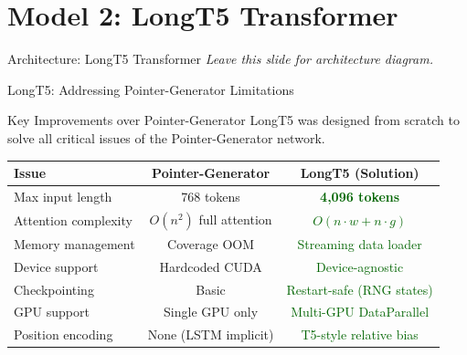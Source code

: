 \documentclass[10pt, aspectratio=169]{beamer}
\begin{document}
\section{Model 2: LongT5 Transformer}

\begin{frame}{Architecture: LongT5 Transformer}
  \vspace{-0.2cm}
  {\small \textit{Leave this slide for architecture diagram.}}
\end{frame}

\begin{frame}{LongT5: Addressing Pointer-Generator Limitations}
  \begin{block}{Key Improvements over Pointer-Generator}
    LongT5 was designed from scratch to solve all critical issues of the Pointer-Generator network.
  \end{block}

  \vspace{0.2cm}

  \begin{table}
    \centering
    \small
    \begin{tabular}{lcc}
      \toprule
      \textbf{Issue} & \textbf{Pointer-Generator} & \textbf{LongT5 (Solution)} \\
      \midrule
      Max input length & 768 tokens & \textcolor{darkgreen}{\textbf{4,096 tokens}} \\
      Attention complexity & $O(n^2)$ full attention & \textcolor{darkgreen}{$O(n \cdot w + n \cdot g)$} \\
      Memory management & Coverage OOM & \textcolor{darkgreen}{Streaming data loader} \\
      Device support & Hardcoded CUDA & \textcolor{darkgreen}{Device-agnostic} \\
      Checkpointing & Basic & \textcolor{darkgreen}{Restart-safe (RNG states)} \\
      GPU support & Single GPU only & \textcolor{darkgreen}{Multi-GPU DataParallel} \\
      Position encoding & None (LSTM implicit) & \textcolor{darkgreen}{T5-style relative bias} \\
      \bottomrule
    \end{tabular}
  \end{table}
\end{frame}
\end{document}
